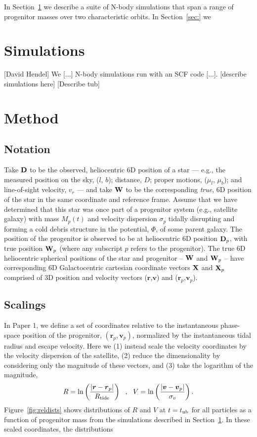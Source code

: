 \documentclass[letterpaper,12pt,preprint]{aastex}
\newcommand{\D}{{\bf D}}
\newcommand{\W}{{\bf W}}
\newcommand{\X}{{\bf X}}
\newcommand{\bs}{\boldsymbol}
\newcommand{\paperone}{Paper 1}
\begin{document}
In Section~\ref{sec:sims} we describe a suite of N-body simulations that span a range of progenitor masses over two characteristic orbits. In Section~\ref{sec:} we 

\section{Simulations}\label{sec:sims}
[David Hendel]
We [...] N-body simulations run with an SCF code [...]. [describe simulations here] [Describe tub]

\section{Method}

\subsection{Notation}
Take $\D$ to be the observed, heliocentric 6D position of a star --- e.g., the measured position on the sky, ($l$, $b$); distance, $D$; proper motions, ($\mu_l$, $\mu_b$); and line-of-sight velocity, $v_r$ --- and take $\W$ to be the corresponding \emph{true}, 6D position of the star in the same coordinate and reference frame. Assume that we have determined that this star was once part of a progenitor system (e.g., satellite galaxy) with mass $M_p(t)$ and velocity dispersion $\sigma_p$ tidally disrupting and forming a cold debris structure in the potential, $\Phi$, of some parent galaxy. The position of the progenitor is observed to be at heliocentric 6D position $\D_p$, with true position $\W_p$ (where any subscript $p$ refers to the progenitor). The true 6D heliocentric spherical positions of the star and progenitor -- $\W$ and $\W_p$ -- have corresponding 6D Galactocentric cartesian coordinate vectors $\X$ and $\X_p$ comprised of 3D position and velocity vectors ($\bs{r}$,$\bs{v}$) and ($\bs{r}_p$,$\bs{v}_p$). 

\subsection{Scalings}

In \paperone, we define a set of coordinates relative to the instantaneous phase-space position of the progenitor, $(\bs{r}_{p},\bs{v}_{p})$, normalized by the instantaneous tidal radius and escape velocity. Here we (1) instead scale the velocity coordinates by the velocity dispersion of the satellite, (2) reduce the dimensionality by considering only the magnitude of these vectors, and (3) take the logarithm of the magnitude,
\begin{equation}
  R = \ln\left(\frac{\left\vert\bs{r} - \bs{r}_{p}\right\vert}{R_{\rm tide}}\right)\,\,\,\,,\,\,\,\,
  V = \ln\left(\frac{\left\vert\bs{v} - \bs{v}_{p}\right\vert}{\sigma_v}\right).
\end{equation}
Figure~\ref{fig:reldists} shows distributions of $R$ and $V$ at $t=t_{\rm ub}$ for all particles as a function of progenitor mass from the simulations described in Section~\ref{sec:sims}. In these scaled coordinates, the distributions 
\end{document}
